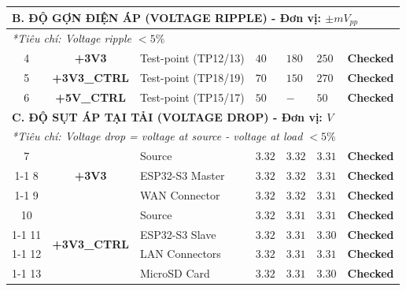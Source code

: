 \begin{longtable}{|c|c|p{4.25cm}|>{\centering\arraybackslash}p{1.25cm}|>{\centering\arraybackslash}p{1.25cm}|>{\centering\arraybackslash}p{1.25cm}|c|}
                    \multicolumn{7}{|l|}{\textbf{B. ĐỘ GỢN ĐIỆN ÁP (VOLTAGE RIPPLE) - Đơn vị: $\pm mV_{pp}$}} \\ \hline
                    \multicolumn{7}{|l|}{\textit{*Tiêu chí: Voltage ripple $< 5\%$}} \\ \hline
                    4 & \textbf{+3V3} & Test-point (TP12/13) & $40$ & $180$ & $250$ & \textcolor{modern_green}{\textbf{Checked}} \\ \hline
                    5 & \textbf{+3V3\_CTRL} & Test-point (TP18/19) & $70$ & $150$ & $270$ & \textcolor{modern_green}{\textbf{Checked}} \\ \hline
                    6 & \textbf{+5V\_CTRL} & Test-point (TP15/17) & $50$ & $-$ & $50$ & \textcolor{modern_green}{\textbf{Checked}} \\ \hline
        
                    \multicolumn{7}{|l|}{\textbf{C. ĐỘ SỤT ÁP TẠI TẢI (VOLTAGE DROP) - Đơn vị: $V$}} \\ \hline
                    \multicolumn{7}{|l|}{\textit{*Tiêu chí: Voltage drop = voltage at source - voltage at load $< 5\%$}} \\ \hline
        
                    7 & \multirow{3}{*}{\textbf{+3V3}} & Source          & $3.32$ & $3.32$ & $3.31$ & \textcolor{modern_green}{\textbf{Checked}} \\ \cline{1-1} \cline{3-7}
                    8 &                                & ESP32-S3 Master & $3.32$ & $3.32$ & $3.31$ & \textcolor{modern_green}{\textbf{Checked}} \\ \cline{1-1} \cline{3-7}
                    9 &                                & WAN Connector   & $3.32$ & $3.32$ & $3.31$ & \textcolor{modern_green}{\textbf{Checked}} \\ \hline
        
        
                    10 & \multirow{4}{*}{\textbf{+3V3\_CTRL}} & Source         & $3.32$ & $3.31$ & $3.31$ & \textcolor{modern_green}{\textbf{Checked}} \\ \cline{1-1} \cline{3-7}
                    11 &                                     & ESP32-S3 Slave & $3.32$ & $3.31$ & $3.30$ & \textcolor{modern_green}{\textbf{Checked}} \\ \cline{1-1} \cline{3-7}
                    12 &                                     & LAN Connectors & $3.32$ & $3.31$ & $3.31$ & \textcolor{modern_green}{\textbf{Checked}} \\ \cline{1-1} \cline{3-7}
                    13 &                                     & MicroSD Card   & $3.32$ & $3.31$ & $3.30$ & \textcolor{modern_green}{\textbf{Checked}} \\ \hline
        

\end{longtable}
